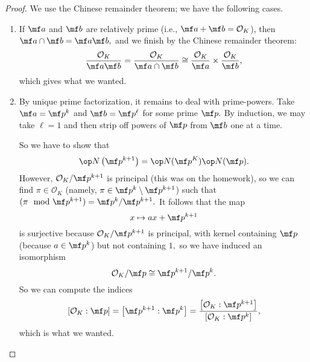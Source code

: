 \begin{proof}
    We use the Chinese remainder theorem; we have the following cases.
    \begin{enumerate}
        \item If $\mf a$ and $\mf b$ are relatively prime (i.e., $\mf a+\mf b=\mathcal O_K$), then $\mf a\cap\mf b=\mf a\mf b,$ and we finish by the Chinese remainder theorem:
        \[\frac{\mathcal O_K}{\mf a\mf b}=\frac{\mathcal O_K}{\mf a\cap\mf b}\cong\frac{\mathcal O_K}{\mf a}\times\frac{\mathcal O_K}{\mf b},\]
        which gives what we wanted.
        \item By unique prime factorization, it remains to deal with prime-powers. Take $\mf a=\mf p^k$ and $\mf b=\mf p^\ell$ for some prime $\mf p.$ By induction, we may take $\ell=1$ and then strip off powers of $\mf p$ from $\mf b$ one at a time.

        So we have to show that
        \[\op N\left(\mf p^{k+1}\right)=\op N(\mf p^K)\op N(\mf p).\]
        However, $\mathcal O_K/\mf p^{k+1}$ is principal (this was on the homework), so we can find $\pi\in\mathcal O_K$ (namely, $\pi\in\mf p^k\setminus\mf p^{k+1}$) such that $(\pi\mod\mf p^{k+1})=\mf p^k/\mf p^{k+1}.$ It follows that the map
        \[x\mapsto ax+\mf p^{k+1}\]
        is surjective because $\mathcal O_K/\mf p^{k+1}$ is principal, with kernel containing $\mf p$ (because $a\in\mf p^k$) but not containing $1,$ so we have induced an isomorphism
        \[\mathcal O_K/\mf p\cong\mf p^{k+1}/\mf p^k.\]
        So we can compute the indices
        \[[\mathcal O_K:\mf p]=\left[\mf p^{k+1}:\mf p^k\right]=\frac{\left[\mathcal O_K:\mf p^{k+1}\right]}{\left[\mathcal O_K:\mf p^k\right]},\]
        which is what we wanted.
        \qedhere
    \end{enumerate}
\end{proof}

